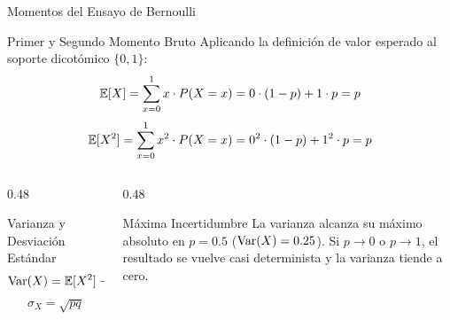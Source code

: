 \documentclass[10pt, aspectratio=169]{beamer}
\begin{document}
\begin{frame}{Momentos del Ensayo de Bernoulli}
  \begin{block}{Primer y Segundo Momento Bruto}
    \footnotesize
    Aplicando la definición de valor esperado al soporte dicotómico $\{0, 1\}$:
    $$\mathbb{E}[X] = \sum_{x=0}^1 x \cdot P(X=x) = 0 \cdot (1-p) + 1 \cdot p = p$$
    $$\mathbb{E}[X^2] = \sum_{x=0}^1 x^2 \cdot P(X=x) = 0^2 \cdot (1-p) + 1^2 \cdot p = p$$
  \end{block}
  \vspace{-0.05cm}
  \pause
  \begin{columns}[T]
    \begin{column}{0.48\textwidth}
      \begin{alertblock}{Varianza y Desviación Estándar}
        \footnotesize
        $$\operatorname{Var}(X) = \mathbb{E}[X^2] - (\mathbb{E}[X])^2 = p - p^2 = p(1-p) = pq$$
        $$\sigma_X = \sqrt{pq}$$
      \end{alertblock}
    \end{column}
    \begin{column}{0.48\textwidth}
      \begin{block}{Máxima Incertidumbre}
        \footnotesize
        La varianza alcanza su máximo absoluto en $p = 0.5$ ($\operatorname{Var}(X) = 0.25$). Si $p \to 0$ o $p \to 1$, el resultado se vuelve casi determinista y la varianza tiende a cero.
      \end{block}
    \end{column}
  \end{columns}
\end{frame}
\end{document}

